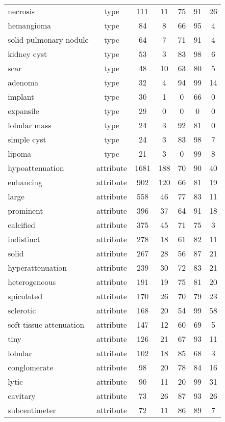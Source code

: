 \documentclass[runningheads]{llncs}
\begin{document}
\begin{table}[]
\begin{tabular}{p{3.6cm}cccccc}
		necrosis	&  type	& 111	& 11	& 75	& 91	& 26 \\
		hemangioma	&  type	& 84	& 8	& 66	& 95	& 4 \\
		solid pulmonary nodule	&  type	& 64	& 7	& 71	& 91	& 4 \\
		kidney cyst	&  type	& 53	& 3	& 83	& 98	& 6 \\
		scar	&  type	& 48	& 10	& 63	& 80	& 5 \\
		adenoma	&  type	& 32	& 4	& 94	& 99	& 14 \\
		implant	&  type	& 30	& 1	& 0	& 66	& 0 \\
		expansile	&  type	& 29	& 0	& 0	& 0	& 0 \\
		lobular mass	&  type	& 24	& 3	& 92	& 81	& 0 \\
		simple cyst	&  type	& 24	& 3	& 83	& 98	& 7 \\
		lipoma	&  type	& 21	& 3	& 0	& 99	& 8 \\
		hypoattenuation	&  attribute	& 1681	& 188	& 70	& 90	& 40 \\
		enhancing	&  attribute	& 902	& 120	& 66	& 81	& 19 \\
		large	&  attribute	& 558	& 46	& 77	& 83	& 11 \\
		prominent	&  attribute	& 396	& 37	& 64	& 91	& 18 \\
		calcified	&  attribute	& 375	& 45	& 71	& 75	& 3 \\
		indistinct	&  attribute	& 278	& 18	& 61	& 82	& 11 \\
		solid	&  attribute	& 267	& 28	& 56	& 87	& 21 \\
		hyperattenuation	&  attribute	& 239	& 30	& 72	& 83	& 21 \\
		heterogeneous	&  attribute	& 191	& 19	& 75	& 81	& 20 \\
		spiculated	&  attribute	& 170	& 26	& 70	& 79	& 23 \\
		sclerotic	&  attribute	& 168	& 20	& 54	& 99	& 58 \\
		soft tissue attenuation	&  attribute	& 147	& 12	& 60	& 69	& 5 \\
		tiny	&  attribute	& 126	& 21	& 67	& 93	& 11 \\
		lobular	&  attribute	& 102	& 18	& 85	& 68	& 3 \\
		conglomerate	&  attribute	& 98	& 20	& 78	& 84	& 16 \\
		lytic	&  attribute	& 90	& 11	& 20	& 99	& 31 \\
		cavitary	&  attribute	& 73	& 26	& 87	& 93	& 26 \\
		subcentimeter	&  attribute	& 72	& 11	& 86	& 89	& 7 \\

\end{tabular}
\end{table}
\end{document}
